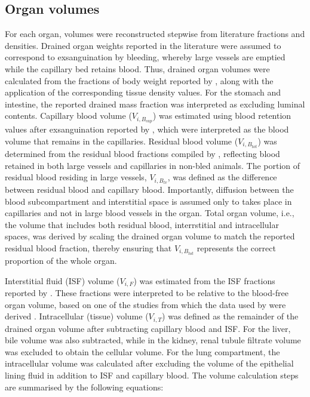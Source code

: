 \documentclass[preprint,12pt,authoryear]{elsarticle}
\begin{document}
 \subsection{Organ volumes}

For each organ, volumes were reconstructed stepwise from literature fractions and densities. Drained organ weights reported in the literature were assumed to correspond to exsanguination by bleeding, whereby large vessels are emptied while the capillary bed retains blood. Thus, drained organ volumes were calculated from the fractions of body weight reported by \citet{brown_1997}, along with the application of the corresponding tissue density values. For the stomach and intestine, the reported drained mass fraction was interpreted as excluding luminal contents. Capillary blood volume ($V_{i,B_{cap}}$) was estimated using blood retention values after exsanguination reported by \citet{bernareggi_1991}, which were interpreted as the blood volume that remains in the capillaries. Residual blood volume ($V_{i,B_{tot}}$) was determined from the residual blood fractions compiled by \citet{brown_1997}, reflecting blood retained in both large vessels and capillaries in non-bled animals. The portion of residual blood residing in large vessels, $V_{i,B_{lv}}$, was defined as the difference between residual blood and capillary blood. Importantly, diffusion between the blood subcompartment and interstitial space is assumed only to takes place in capillaries and not in large blood vessels in the organ. Total organ volume, i.e., the volume that includes both residual blood, interrstitial and intracellular spaces, was derived by scaling the drained organ volume to match the reported residual blood fraction, thereby ensuring that $V_{i,B_{tot}}$ represents the correct proportion of the whole organ. 

Interstitial fluid (ISF) volume ($V_{i,F}$) was estimated from the ISF fractions reported by \citet{kawai_1994}. These fractions were interpreted to be relative to the blood-free organ volume, based on one of the studies from which the data used by \citet{kawai_1994} were derived \citep{tsuji_1983}. Intracellular (tissue) volume ($V_{i,T}$) was defined as the remainder of the drained organ volume after subtracting capillary blood and ISF. For the liver, bile volume was also subtracted, while in the kidney, renal tubule filtrate volume was excluded to obtain the cellular volume. For the lung compartment, the intracellular volume was calculated after excluding the volume of the epithelial lining fluid in addition to ISF and capillary blood. The volume calculation steps are summarised by the following equations:
\end{document}
